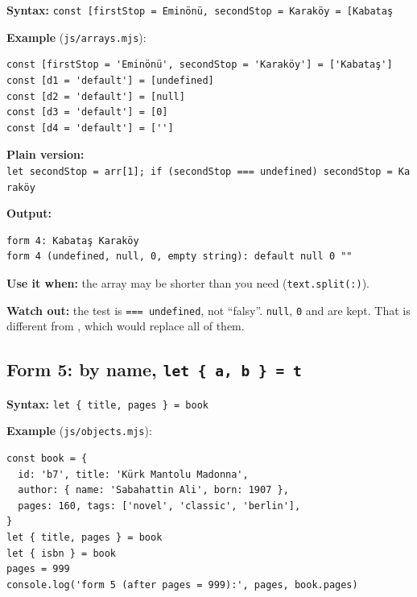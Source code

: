 \documentclass[
  10pt,
]{article}
\begin{document}
\textbf{Syntax:}
\texttt{const\ {[}firstStop\ =\ \allowbreak{}\textquotesingle{}Eminönü\allowbreak{}\textquotesingle{},\ secondStop\ =\ \allowbreak{}\textquotesingle{}Karaköy\allowbreak{}\textquotesingle{}{]\allowbreak{}}\ =\ {[}\allowbreak{}\textquotesingle{}Kabataş\allowbreak{}\textquotesingle{}{]\allowbreak{}}}

\textbf{Example} (\texttt{js/\allowbreak{}arrays.\allowbreak{}mjs}):

\begin{verbatim}
const [firstStop = 'Eminönü', secondStop = 'Karaköy'] = ['Kabataş']
const [d1 = 'default'] = [undefined]
const [d2 = 'default'] = [null]
const [d3 = 'default'] = [0]
const [d4 = 'default'] = ['']
\end{verbatim}

\textbf{Plain version:}
\texttt{let\ secondStop\ =\ arr{[}1{]\allowbreak{}};\ if\ (secondStop\ ===\ undefined)\ secondStop\ =\ \allowbreak{}\textquotesingle{}Karaköy\allowbreak{}\textquotesingle{}}

\textbf{Output:}

\begin{verbatim}
form 4: Kabataş Karaköy
form 4 (undefined, null, 0, empty string): default null 0 ""
\end{verbatim}

\textbf{Use it when:} the array may be shorter than you need
(\texttt{text.\allowbreak{}split(\allowbreak{}\textquotesingle{}:\allowbreak{}\textquotesingle{})}).

\textbf{Watch out:} the test is \texttt{===\ undefined}, not ``falsy''.
\texttt{null}, \texttt{0} and
\texttt{\allowbreak{}\textquotesingle{}\allowbreak{}\textquotesingle{}}
are kept. That is different from \texttt{\textbar{}\textbar{}}, which
would replace all of them.

\hypertarget{form-5-by-name-let--a-b---t}{%
\subsection{\texorpdfstring{Form 5: by name,
\texttt{let\ \{\ a,\ b\ \}\ =\ t}}{Form 5: by name, }}\label{form-5-by-name-let--a-b---t}}

\textbf{Syntax:} \texttt{let\ \{\ title,\ pages\ \}\ =\ book}

\textbf{Example} (\texttt{js/\allowbreak{}objects.\allowbreak{}mjs}):

\begin{verbatim}
const book = {
  id: 'b7', title: 'Kürk Mantolu Madonna',
  author: { name: 'Sabahattin Ali', born: 1907 },
  pages: 160, tags: ['novel', 'classic', 'berlin'],
}
let { title, pages } = book
let { isbn } = book
pages = 999
console.log('form 5 (after pages = 999):', pages, book.pages)
\end{verbatim}
\end{document}
